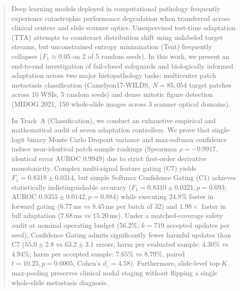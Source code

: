 \documentclass[conference]{IEEEtran}
\begin{document}
\begin{abstract}
Deep learning models deployed in computational pathology frequently experience catastrophic performance degradation when transferred across clinical centers and slide scanner optics. Unsupervised test-time adaptation (TTA) attempts to counteract distribution shift using unlabeled target streams, but unconstrained entropy minimization (Tent) frequently collapses ($F_1 \approx 0.05$ on 2 of 5 random seeds). In this work, we present an end-to-end investigation of fail-closed safeguards and biologically informed adaptation across two major histopathology tasks: multicenter patch metastasis classification (Camelyon17-WILDS, $N=85{,}054$ target patches across 10 WSIs, 5 random seeds) and dense mitotic figure detection (MIDOG 2021, 150 whole-slide images across 3 scanner optical domains).

In Track~A (Classification), we conduct an exhaustive empirical and mathematical audit of seven adaptation controllers. We prove that single-logit binary Monte Carlo Dropout variance and max-softmax confidence induce near-identical patch sample rankings (Spearman $\rho = -0.9917$, identical error AUROC $0.9949$) due to strict first-order derivative monotonicity. Complex multi-signal feature gating (C7) yields $F_1 = 0.8318 \pm 0.0314$, but simple Softmax Confidence Gating (C1) achieves statistically indistinguishable accuracy ($F_1 = 0.8310 \pm 0.0321, p=0.693$; AUROC $0.9355 \pm 0.0142, p=0.884$) while executing $24.8\%$ faster in forward gating ($6.77$\,ms vs $8.45$\,ms per batch of 32) and $1.98\times$ faster in full adaptation ($7.68$\,ms vs $15.20$\,ms). Under a matched-coverage safety audit at nominal operating budget ($56.2\%$, $k=719$ accepted updates per seed), Confidence Gating admits significantly fewer harmful updates than C7 ($55.0 \pm 2.8$ vs $63.2 \pm 3.1$ errors; harm per evaluated sample: $4.30\%$ vs $4.94\%$; harm per accepted sample: $7.65\%$ vs $8.79\%$, paired $t=10.25, p=0.0005$, Cohen's $d_z = 4.58$). Furthermore, slide-level top-$K$ max-pooling preserves clinical nodal staging without flipping a single whole-slide metastasis diagnosis.


\end{abstract}
\end{document}
